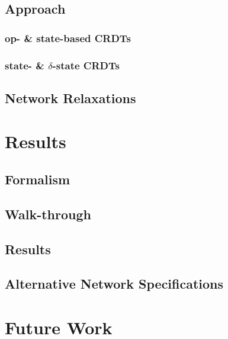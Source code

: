 \documentclass{thesis}
\begin{document}
  \section{Approach}
  \subsection{op- \& state-based CRDTs}
  \subsection{state- \& $\delta$-state CRDTs}
  \section{Network Relaxations}

  \chapter{Results}
  \section{Formalism}
  \section{Walk-through}
  \section{Results}
  \section{Alternative Network Specifications}

  \chapter{Future Work}

  \newpage
  
\end{document}
